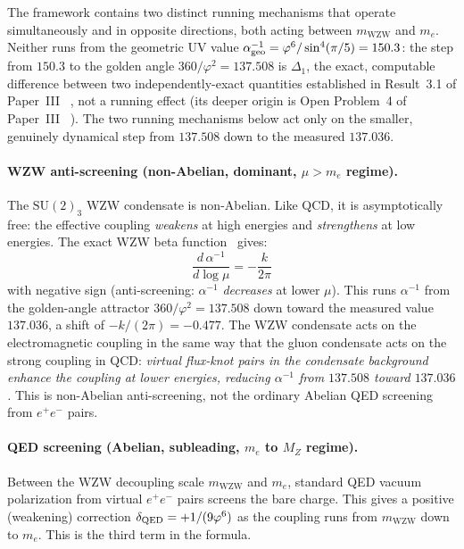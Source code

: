 \documentclass[11pt,a4paper]{article}
\theoremstyle{definition}
\theoremstyle{remark}
\newcommand{\vp}{\varphi}
\newcommand{\aInv}{\alpha^{-1}}
\newcommand{\mWZW}{m_{\mathrm{WZW}}}
\begin{document}
The framework contains two distinct running mechanisms that operate
simultaneously and in opposite directions, both acting between
$\mWZW$ and $m_e$. Neither runs from the geometric UV value
$\aInv_{\rm geo}=\vp^6/\sin^4(\pi/5)=150.3$: the step from $150.3$ to
the golden angle $360/\vp^2=137.508$ is $\Delta_1$, the exact,
computable difference between two independently-exact quantities
established in Result~3.1 of Paper~III~\cite{Paper3}%
, not a running effect (its deeper origin is Open Problem~4
of Paper~III~\cite{Paper3}%
). The two running mechanisms below act only on the
smaller, genuinely dynamical step from $137.508$ down to the measured
$137.036$.

\paragraph{WZW anti-screening (non-Abelian, dominant, $\mu > m_e$ regime).}
The $\mathrm{SU}(2)_3$ WZW condensate is non-Abelian.
Like QCD, it is asymptotically free: the effective coupling \emph{weakens}
at high energies and \emph{strengthens} at low energies.
The exact WZW beta function~\cite{KZ1984} gives:
\begin{equation}
  \frac{d\,\aInv}{d\log\mu} = -\frac{k}{2\pi}
  \label{P4:eq:wzw_beta_running}
\end{equation}
with negative sign (anti-screening: $\aInv$ \emph{decreases} at lower $\mu$).
This runs $\aInv$ from the golden-angle attractor $360/\vp^2=137.508$
down toward the measured value $137.036$, a shift of $-k/(2\pi)=-0.477$.
The WZW condensate acts on the electromagnetic coupling in the same way
that the gluon condensate acts on the strong coupling in QCD:
\emph{virtual flux-knot pairs in the condensate background enhance the
coupling at lower energies, reducing $\aInv$ from $137.508$ toward $137.036$.}
This is non-Abelian anti-screening, not the ordinary Abelian QED screening
from $e^+e^-$ pairs.

\paragraph{QED screening (Abelian, subleading, $m_e$ to $M_Z$ regime).}
Between the WZW decoupling scale $\mWZW$ and $m_e$, standard QED vacuum
polarization from virtual $e^+e^-$ pairs screens the bare charge.
This gives a positive (weakening) correction $\delta_{\rm QED} = +1/(9\vp^6)$
as the coupling runs from $\mWZW$ down to $m_e$.  This is the third term
in the formula.
\end{document}
